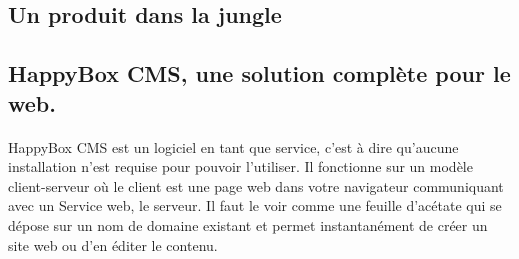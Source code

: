 \documentclass[11pt, a4paper ]{article}
\let\stdsection\section
\renewcommand\section{\newpage\stdsection}
\begin{document}
\begin{spacing}{1.5}







		\section{Un produit dans la jungle} %

			\subsection{HappyBox CMS, une solution complète pour le web.}

\paragraph{}
HappyBox CMS est un logiciel en tant que service, c'est à dire qu'aucune installation n'est requise pour pouvoir l'utiliser. Il fonctionne sur un modèle client-serveur où le client est une page web dans votre navigateur communiquant avec un Service web, le serveur. Il faut le voir comme une feuille d'acétate qui se dépose sur un nom de domaine existant et permet instantanément de créer un site web ou d'en éditer le contenu.


\end{spacing}
\end{document}
